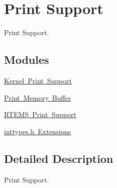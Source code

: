 \hypertarget{group__RTEMSAPIPrintSupport}{}\section{Print Support}
\label{group__RTEMSAPIPrintSupport}


Print Support.  


\subsection*{Modules}
\begin{DoxyCompactItemize}
\item 
\mbox{\hyperlink{group__BSPIO}{Kernel Print Support}}
\item 
\mbox{\hyperlink{group__libmisc__dumpbuf}{Print Memory Buffer}}
\item 
\mbox{\hyperlink{group__RTEMSPrintSupport}{R\+T\+E\+M\+S Print Support}}
\item 
\mbox{\hyperlink{group__RTEMS}{inttypes.\+h Extensions}}
\end{DoxyCompactItemize}


\subsection{Detailed Description}
Print Support. 

